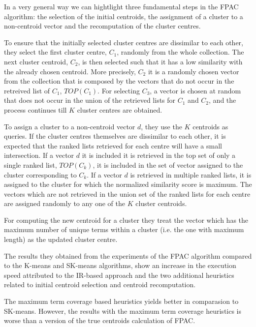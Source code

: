 \documentclass[runningheads]{llncs}
\begin{document}
In a very general way we can hightlight three fundamental
steps in the FPAC algorithm: the selection of the initial centroids, the assignment of a cluster to a non-centroid vector and the recomputation of the cluster centres.

To ensure that the initially selected cluster centres are dissimilar
to each other, they select the first cluster centre, $C_1$, randomly from
the whole collection. The next cluster centroid, $C_2$, is then selected
such that it has a low similarity with the already chosen centroid.
More precisely, $C_2$ it is a randomly chosen vector from the collection
that is composed by the vectors that do not occur in the retreived list of 
$C_1$, $TOP(C_1)$. For selecting $C_3$, a vector is chosen at random that
does not occur in the union of the retrieved lists for $C_1$ and $C_2$, and
the process continues till $K$ cluster centres are obtained.

To assign a cluster to a non-centroid vector $d$, they use the $K$ centroids
as queries. If the cluster centres themselves are dissimilar to
each other, it is expected that the ranked lists retrieved for each
centre will have a small intersection. If a vector $d$ it is included it
is retrieved in the top set of only a single ranked list, $TOP(C_k)$,
it is included in the set of vector assigned to the cluster corresponding
to $C_k$. If a vector $d$ is retrieved in multiple ranked lists, 
it is assigned to the cluster for which the normalized
similarity score is maximum. The vectors which are not retrieved in the
union set of the ranked lists for each 
centre are assigned randomly to any one of the $K$ cluster centroids.

For computing the new centroid for a cluster they treat the vector 
which has the maximum number of unique terms within a cluster (i.e. 
the one with maximum length) as the updated cluster centre.


The results they obtained from the experiments of the FPAC algorithm
compared to the K-means and SK-means algorithms,
show an increase in the execution speed attributed to the IR-based approach
and the two additional heuristics related to initial centroid selection and 
centroid recomputation.

The maximum term coverage based heuristics yields better in
comparasion to SK-means. However, the results with the
maximum term coverage heuristics is worse than a version of
the true centroids calculation of FPAC.
\end{document}
